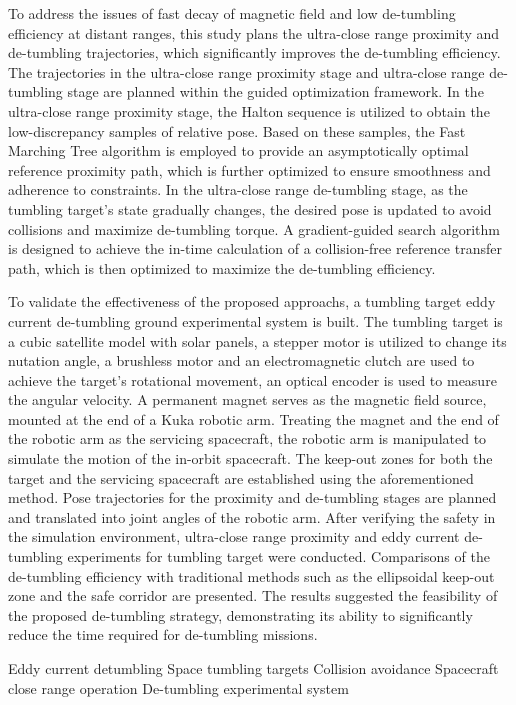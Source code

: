 \documentclass[lang=chs, degree=master, blindreview=false, winfonts=true]{yanputhesis}
\begin{document}
\begin{engabstract}
    To address the issues of fast decay of magnetic field and low de-tumbling efficiency at distant ranges, this study plans the ultra-close range proximity and de-tumbling trajectories, which significantly improves the de-tumbling efficiency. The trajectories in the ultra-close range proximity stage and ultra-close range de-tumbling stage are planned within the guided optimization framework. In the ultra-close range proximity stage, the Halton sequence is utilized to obtain the low-discrepancy samples of relative pose. Based on these samples, the Fast Marching Tree algorithm is employed to provide an asymptotically optimal reference proximity path, which is further optimized to ensure smoothness and adherence to constraints. In the ultra-close range de-tumbling stage, as the tumbling target's state gradually changes, the desired pose is updated to avoid collisions and maximize de-tumbling torque. A gradient-guided search algorithm is designed to achieve the in-time calculation of a collision-free reference transfer path, which is then optimized to maximize the de-tumbling efficiency.
    
    To validate the effectiveness of the proposed approachs, a tumbling target eddy current de-tumbling ground experimental system is built. The tumbling target is a cubic satellite model with solar panels, a stepper motor is utilized to change its nutation angle, a brushless motor and an electromagnetic clutch are used to achieve the target's rotational movement, an optical encoder is used to measure the angular velocity. A permanent magnet serves as the magnetic field source, mounted at the end of a Kuka robotic arm. Treating the magnet and the end of the robotic arm as the servicing spacecraft, the robotic arm is manipulated to simulate the motion of the in-orbit spacecraft. The keep-out zones for both the target and the servicing spacecraft are established using the aforementioned method. Pose trajectories for the proximity and de-tumbling stages are planned and translated into joint angles of the robotic arm. After verifying the safety in the simulation environment, ultra-close range proximity and eddy current de-tumbling experiments for tumbling target were conducted. Comparisons of the de-tumbling efficiency with traditional methods such as the ellipsoidal keep-out zone and the safe corridor are presented. The results suggested the feasibility of the proposed de-tumbling strategy, demonstrating its ability to significantly reduce the time required for de-tumbling missions.
    \begin{engkeywords}                                     %
        Eddy current detumbling \ensep Space tumbling targets \ensep Collision avoidance \ensep Spacecraft close range operation \ensep De-tumbling experimental system                 %
    \end{engkeywords}                                       %
\end{engabstract}                                           %
\end{document}

